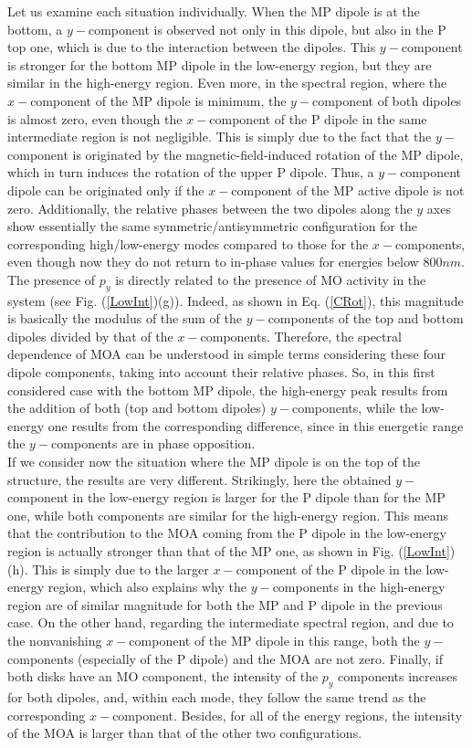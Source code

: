 Let us examine each situation individually. When the MP dipole is at the bottom, a $y-$component is observed not only in this dipole, but also in the P top one, which is due to the interaction between the dipoles. This $y-$component is stronger for the bottom MP dipole in the low-energy region, but they are similar in the high-energy region. Even more, in the spectral region, where the $x-$component of the MP dipole is minimum, the $y-$component of both dipoles is almost zero, even though the $x-$component of the P dipole in the same intermediate region is not negligible. This is simply due to the fact that the $y-$component is originated by the magnetic-field-induced rotation of the MP dipole, which in turn induces the rotation of the upper P dipole. Thus, a $y-$component dipole can be originated only if the $x-$component of the MP active dipole is not zero. Additionally, the relative phases between the two dipoles along the $y$ axes show essentially the same symmetric/antisymmetric configuration for the corresponding high/low-energy modes compared to those for the $x-$components, even though now they do not return to in-phase values for energies below $800nm$. The presence of $p_y$ is directly related to the presence of MO activity in the system (see Fig. (\ref{LowInt})(g)). Indeed, as shown in Eq. (\ref{CRot}), this magnitude is basically the modulus of the sum of the $y-$components of the top and bottom dipoles divided by that of the $x-$components. Therefore, the spectral dependence of MOA can be understood in simple terms considering these four dipole components, taking into account their relative phases. So, in this first considered case with the bottom MP dipole, the high-energy peak results from the addition of both (top and bottom dipoles) $y-$components, while the low-energy one results from the corresponding difference, since in this energetic range the $y-$components are in phase opposition.\\
If we consider now the situation where the MP dipole is on the top of the structure, the results are very different. Strikingly, here the obtained $y-$component in the low-energy region is larger for the P dipole than for the MP one, while both components are similar for the high-energy region. This means that the contribution to the MOA coming from the P dipole in the low-energy region is actually stronger than that of the MP one, as shown in Fig. (\ref{LowInt})(h). This is simply due to the larger $x-$component of the P dipole in the low-energy region, which also explains why the $y-$components in the high-energy region are of similar magnitude for both the MP and P dipole in the previous case. On the other hand, regarding the intermediate spectral region, and due to the nonvanishing $x-$component of the MP dipole in this range, both the $y-$components (especially of the P dipole) and the MOA are not zero.
Finally, if both disks have an MO component, the intensity of the $p_y$ components increases for both dipoles, and, within each mode, they follow the same trend as the corresponding $x-$component. Besides, for all of the energy regions, the  intensity of the MOA is larger than that of the other two configurations. 

